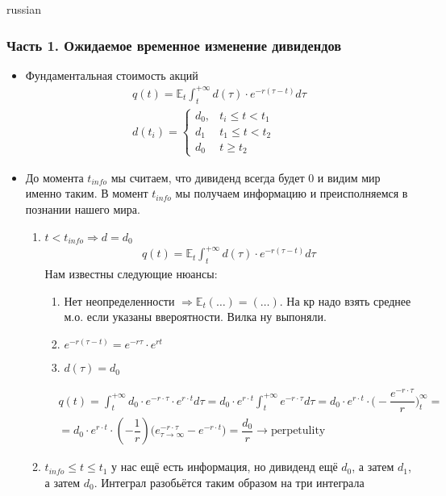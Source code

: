 \documentclass{article}
\begin{document}
\begin{otherlanguage*}{russian}
\subsubsection*{Часть 1. Ожидаемое временное изменение дивидендов}
\begin{itemize}
\item Фундаментальная стоимость акций 
\begin{align*}
q(t) = \mathbb{E}_t \int_t^{+\infty} d(\tau) \cdot e^{-r(\tau - t)} d \tau \\
d(t_i) = \begin{cases}
d_0, & t_i \le t < t_1 \\
d_1 & t_1 \le t < t_2 \\
d_0 & t \ge t_2
\end{cases}
\end{align*}
\item До момента $ t_{info} $ мы считаем, что дивиденд всегда будет 0 и видим мир именно таким. В момент $ t_{info} $ мы получаем информацию и преисполняемся в познании нашего мира. 
\begin{enumerate}
\item $ t < t_{info} \Rightarrow d = d_0 $ 
\begin{align*}
q(t) = \mathbb{E}_t \int_t^{+\infty} d(\tau) \cdot e^{-r(\tau - t)} d \tau 
\end{align*}
Нам известны следующие нюансы: 
\begin{enumerate}
\item Нет неопределенности $ \Rightarrow \mathbb{E}_t (\ldots) = (\ldots) $. На кр надо взять среднее м.о. если указаны ввероятности. Вилка ну выпоняли. 
\item $ e^{-r (\tau - t)} = e^{-r \tau} \cdot e^{rt} $ 
\item $ d(\tau) = d_0 $ 
\end{enumerate}
\begin{align*}
&q(t) = \int_t^{+\infty} d_0 \cdot e^{-r \cdot \tau} \cdot e^{r \cdot t}  d \tau = d_0 \cdot e^{r \cdot t} \int_t^{+\infty} e^{-r \cdot \tau} d \tau = d_0 \cdot e^{r \cdot t} \cdot \Big( - \dfrac{e^{-r \cdot \tau}}{r} \Big)_{t}^{\infty} = \\
&= d_0 \cdot e^{r \cdot t} \cdot (-\dfrac{1}{r}) \Big( e^{-r \cdot \tau}_{\tau \rightarrow \infty} - e^{-r \cdot t} \Big) = \dfrac{d_0}{r} \rightarrow \text{perpetulity} 
\end{align*}
\item $ t_{info} \le t \le t_1 $ у нас ещё есть информация, но дивиденд ещё $ d_0$, а затем $ d_1 $, а затем $ d_0 $. Интеграл разобьётся таким образом на три интеграла 

\end{enumerate}
\end{itemize}
\end{otherlanguage*}
\end{document}
